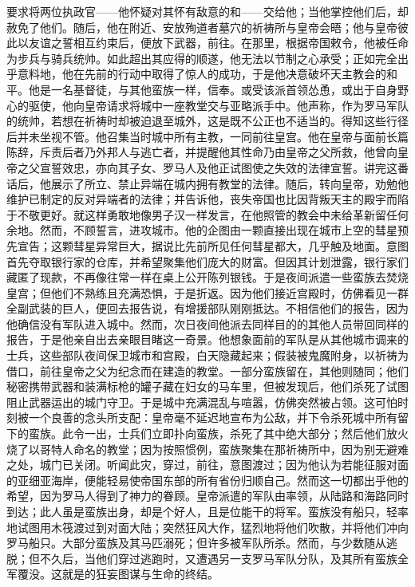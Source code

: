 要求将两位执政官——他怀疑对其怀有敌意的和——交给他；当他掌控他们后，却赦免了他们。随后，他在附近、安放殉道者墓穴的祈祷所与皇帝会晤；他与皇帝彼此以友谊之誓相互约束后，便放下武器，前往。在那里，根据帝国敕令，他被任命为步兵与骑兵统帅。如此超出其应得的顺遂，他无法以节制之心承受；正如完全出乎意料地，他在先前的行动中取得了惊人的成功，于是他决意破坏天主教会的和平。他是一名基督徒，与其他蛮族一样，信奉。或受该派首领怂恿，或出于自身野心的驱使，他向皇帝请求将城中一座教堂交与亚略派手中。他声称，作为罗马军队的统帅，若想在祈祷时却被迫退至城外，这是既不公正也不适当的。得知这些行径后并未坐视不管。他召集当时城中所有主教，一同前往皇宫。他在皇帝与面前长篇陈辞，斥责后者乃外邦人与逃亡者，并提醒他其性命乃由皇帝之父所救，他曾向皇帝之父宣誓效忠，亦向其子女、罗马人及他正试图使之失效的法律宣誓。讲完这番话后，他展示了所立、禁止异端在城内拥有教堂的法律。随后，转向皇帝，劝勉他维护已制定的反对异端者的法律；并告诉他，丧失帝国也比因背叛天主的殿宇而陷于不敬更好。就这样勇敢地像男子汉一样发言，在他照管的教会中未给革新留任何余地。然而，不顾誓言，进攻城市。他的企图由一颗直接出现在城市上空的彗星预先宣告；这颗彗星异常巨大，据说比先前所见任何彗星都大，几乎触及地面。意图首先夺取银行家的仓库，并希望聚集他们庞大的财富。但因其计划泄露，银行家们藏匿了现款，不再像往常一样在桌上公开陈列银钱。于是夜间派遣一些蛮族去焚烧皇宫；但他们不熟练且充满恐惧，于是折返。因为他们接近宫殿时，仿佛看见一群全副武装的巨人，便回去报告说，有增援部队刚刚抵达。不相信他们的报告，因为他确信没有军队进入城中。然而，次日夜间他派去同样目的的其他人员带回同样的报告，于是他亲自出去亲眼目睹这一奇景。他想象面前的军队是从其他城市调来的士兵，这些部队夜间保卫城市和宫殿，白天隐藏起来；假装被鬼魔附身，以祈祷为借口，前往皇帝之父为纪念而在建造的教堂。一部分蛮族留在，其他则随同；他们秘密携带武器和装满标枪的罐子藏在妇女的马车里，但被发现后，他们杀死了试图阻止武器运出的城门守卫。于是城中充满混乱与喧嚣，仿佛突然被占领。这可怕时刻被一个良善的念头所支配：皇帝毫不延迟地宣布为公敌，并下令杀死城中所有留下的蛮族。此令一出，士兵们立即扑向蛮族，杀死了其中绝大部分；然后他们放火烧了以哥特人命名的教堂；因为按照惯例，蛮族聚集在那祈祷所中，因为别无避难之处，城门已关闭。听闻此灾，穿过，前往，意图渡过；因为他认为若能征服对面的亚细亚海岸，便能轻易使帝国东部的所有省份归顺自己。然而这一切都出乎他的希望，因为罗马人得到了神力的眷顾。皇帝派遣的军队由率领，从陆路和海路同时到达；此人虽是蛮族出身，却是个好人，且是位能干的将军。蛮族没有船只，轻率地试图用木筏渡过到对面大陆；突然狂风大作，猛烈地将他们吹散，并将他们冲向罗马船只。大部分蛮族及其马匹溺死；但许多被军队所杀。然而，与少数随从逃脱；但不久后，当他们穿过逃跑时，又遭遇另一支罗马军队分队，及其所有蛮族全军覆没。这就是的狂妄图谋与生命的终结。\par


